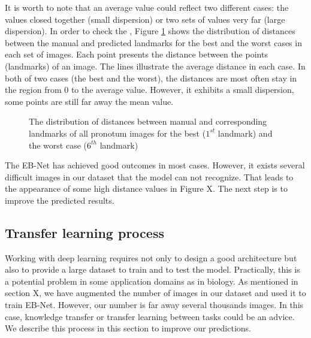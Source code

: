 \documentclass[review]{elsarticle}
\begin{document}
It is worth to note that an average value could reflect two different cases: the values closed together (small dispersion) or two sets of values very far (large dispersion). In order to check the , Figure \ref{figprodist} shows the distribution of distances between the manual and predicted landmarks for the best and the worst cases in each set of images. Each point presents the distance between the points (landmarks) of an image. The lines illustrate the average distance in each case. In both of two cases (the best and the worst), the distances are most often stay in the region from 0 to the average value. However, it exhibits a small dispersion, some points are still far away the mean value.

\begin{figure}[h!]
    \centering
    \hspace{0.5cm}
    \caption{The distribution of distances between manual and corresponding landmarks of all pronotum images for the best ($1^{st}$ landmark) and the worst case ($6^{th}$ landmark)}
    \label{figprodist}
\end{figure}

The EB-Net has achieved good outcomes in most cases. However, it exists several difficult images in our dataset that the model can not recognize. That leads to the appearance of some high distance values in Figure X. The next step is to improve the predicted results.

\subsection{Transfer learning process}
Working with deep learning requires not only to design a good architecture but also to provide a large dataset to train and to test the model. Practically, this is a potential problem in some application domains as in biology. As mentioned in section X, we have augmented the number of images in our dataset and used it to train EB-Net. However, our number is far away several thousands images. In this case, knowledge transfer or transfer learning between tasks could be an advice. We describe this process in this section to improve our predictions.
\end{document}
